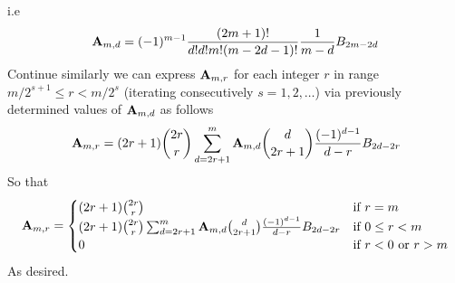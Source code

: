 i.e
\begin{equation*}
    {\mathbf{A}} \sb{m,d} = (-1)^{m-1} \frac{(2m+1)!}{d!d!m!(m-2d-1)!} \frac{1}{m-d} {B}\sb{2m-2d}
\end{equation*}
Continue similarly we can express ${\mathbf{A}} \sb{m,r}$ for each integer $r$ in range $m/2^{s+1}\leq r < m/2^s$
(iterating consecutively $s=1,2,\ldots$) via previously determined values of ${\mathbf{A}} \sb{m,d}$ as follows
\begin{equation*}
    {\mathbf{A}} \sb{m,r} =
    (2r+1) \binom{2r}{r} \sum_{d=2r+1}^{m} {\mathbf{A}} \sb{m,d} \binom{d}{2r+1} \frac{(-1)^{d-1}}{d-r}
    {B}\sb{2d-2r}
\end{equation*}
So that
\begin{align*}
    {\mathbf{A}} \sb{m,r} =
    \begin{cases}
    (2r+1)
        \binom{2r}{r} & \text{if } r=m \\
        (2r+1) \binom{2r}{r} \sum_{d=2r+1}^{m} {\mathbf{A}} \sb{m,d} \binom{d}{2r+1} \frac{(-1)^{d-1}}{d-r}
        {B}\sb{2d-2r} & \text{if } 0 \leq r<m \\
        0 & \text{if } r<0 \text{ or } r>m
    \end{cases}
\end{align*}
As desired.
